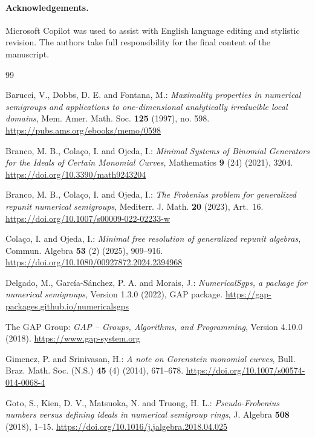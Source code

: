 \documentclass[12pt,a4paper]{amsart}
\theoremstyle{definition}
\begin{document}
\paragraph{\bf Acknowledgements.}
Microsoft Copilot was used to assist with English language editing and stylistic revision. The authors take full responsibility for the final content of the manuscript.

\begin{thebibliography}{99}

{Barucci, V., Dobbs, D. E. and Fontana, M.}:
\emph{Maximality properties in numerical semigroups and applications to one-dimensional analytically irreducible local domains},
Mem. Amer. Math. Soc. \textbf{125} (1997), no. 598.
\url{https://pubs.ams.org/ebooks/memo/0598}

{Branco, M. B., Cola\c{c}o, I. and Ojeda, I.}:
\emph{Minimal Systems of Binomial Generators for the Ideals of Certain Monomial Curves},
Mathematics \textbf{9} (24) (2021), 3204.
\url{https://doi.org/10.3390/math9243204}

{Branco, M. B., Cola\c{c}o, I. and Ojeda, I.}:
\emph{The Frobenius problem for generalized repunit numerical semigroups},
Mediterr. J. Math. \textbf{20} (2023), Art.~16.
\url{https://doi.org/10.1007/s00009-022-02233-w}

{Cola\c{c}o, I. and Ojeda, I.}:
\emph{Minimal free resolution of generalized repunit algebras},
Commun. Algebra \textbf{53} (2) (2025), 909--916.
\url{https://doi.org/10.1080/00927872.2024.2394968}

{Delgado, M., Garc\'ia-S\'anchez, P. A. and Morais, J.}:
\emph{NumericalSgps, a package for numerical semigroups}, Version 1.3.0 (2022),
GAP package.
\url{https://gap-packages.github.io/numericalsgps}

{The GAP Group}:
\emph{GAP -- Groups, Algorithms, and Programming}, Version 4.10.0 (2018).
\url{https://www.gap-system.org}

{Gimenez, P. and Srinivasan, H.}:
\emph{A note on Gorenstein monomial curves},
Bull. Braz. Math. Soc. (N.S.) \textbf{45} (4) (2014), 671--678.
\url{https://doi.org/10.1007/s00574-014-0068-4}

{Goto, S., Kien, D. V., Matsuoka, N. and Truong, H. L.}:
\emph{Pseudo-Frobenius numbers versus defining ideals in numerical semigroup rings},
J. Algebra \textbf{508} (2018), 1--15.
\url{https://doi.org/10.1016/j.jalgebra.2018.04.025}


\end{thebibliography}
\end{document}
